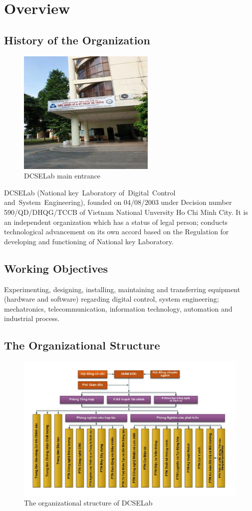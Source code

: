 \chapter{Overview}
\section{History of the Organization }
\begin{figure}
	\centering
	\includegraphics[width=0.4\linewidth]{01}
	\caption{DCSELab main entrance}
	\label{fig:01}
\end{figure}
DCSELab (National key Laboratory of Digital Control and System Engineering), founded on 04/08/2003 under Decision number 590/QD/DHQG/TCCB of Vietnam National Unversity Ho Chi Minh City. It is an independent organization which has a status of legal person; conducts technological advancement on its own accord based on the Regulation for developing and functioning of National key Laboratory.

\section{Working Objectives}
Experimenting, designing, installing, maintaining and transferring equipment (hardware and software) regarding digital control, system engineering; mechatronics, telecommunication, information technology, automation and industrial process.
\section{The Organizational Structure}
\begin{figure}[ht]
	\centering
	\includegraphics[width=0.7\linewidth]{02}
	\caption{The organizational structure of DCSELab}
	\label{fig:02}
\end{figure}
